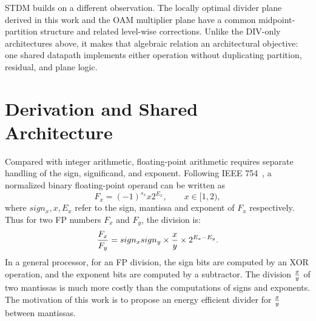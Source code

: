 \documentclass[conference]{IEEEtran}
\begin{document}
STDM builds on a different observation. The locally optimal divider plane
derived in this work and the OAM multiplier plane have a common
midpoint-partition structure and related level-wise corrections. Unlike the
DIV-only architectures above, it makes that algebraic relation an
architectural objective: one shared datapath implements either operation
without duplicating partition, residual, and plane logic.

\section{Derivation and Shared Architecture}
Compared with integer arithmetic, floating-point arithmetic requires separate
handling of the sign, significand, and exponent. Following IEEE 754~\cite{Ieee},
a normalized binary floating-point operand can be written as
\[F_x=(-1)^{s_x}x2^{E_x},\qquad x\in[1,2),\]
where $sign_{x}, x, E_{x}$ refer to the sign, mantissa and exponent of $F_{x}$ respectively. Thus for two FP numbers $F_{x}$ and $F_{y}$, the division is:
$${F_{x}\over F_{y}}=sign_{x}sign_{y}\times {x\over y}\times 2^{E_{x}-E_{y}}.$$
In a general processor, for an FP division, the sign bits are computed by an XOR operation, and the exponent bits are computed by a subtractor. The division ${x\over y}$ of two mantissas is much more costly than the computations of signs and exponents. The motivation of this work is to propose an energy efficient divider for ${x\over y}$ between mantissas.
\end{document}
